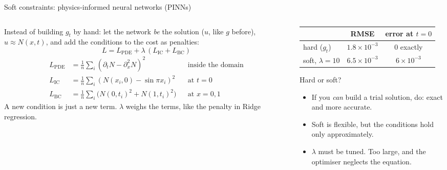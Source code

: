 \documentclass[10pt,aspectratio=169]{beamer}
\begin{document}
\begin{frame}{Soft constraints: physics-informed neural networks (PINNs)}
\begin{columns}[T]
\begin{column}{0.52\textwidth}
\small
Instead of building $g_t$ by hand: let the network \emph{be} the solution
($u$, like $g$ before), $u\approx N(x,t)$, and add the conditions to the cost as penalties:
\[
  L=L_{\mathrm{PDE}}+\lambda\,(L_{\mathrm{IC}}+L_{\mathrm{BC}})
\]
\footnotesize
\vspace{-8pt}
\begin{align*}
  L_{\mathrm{PDE}}&=\tfrac1{n}\textstyle\sum_i(\partial_tN-\partial_x^{2}N)^{2}
     &&\text{inside the domain}\\
  L_{\mathrm{IC}}&=\tfrac1{n}\textstyle\sum_i(N(x_i,0)-\sin\pi x_i)^{2}
     &&\text{at }t=0\\
  L_{\mathrm{BC}}&=\tfrac1{n}\textstyle\sum_i\bigl(N(0,t_i)^{2}+N(1,t_i)^{2}\bigr)
     &&\text{at }x=0,1
\end{align*}
\small
A new condition is just a new term.  $\lambda$ weighs the terms, like the
penalty in Ridge regression.
\end{column}
\begin{column}{0.46\textwidth}
\small
\begin{center}
\begin{tabular}{@{}lcc@{}}
\toprule
& RMSE & error at $t=0$\\
\midrule
hard ($g_t$) & $1.8\times10^{-3}$ & $0$ exactly\\
soft, $\lambda=10$ & $6.5\times10^{-3}$ & $6\times10^{-3}$\\
\bottomrule
\end{tabular}
\end{center}
\begin{block}{Hard or soft?}
\begin{itemize}
  \item If you \emph{can} build a trial solution, do: exact and more
        accurate.
  \item Soft is flexible, but the conditions hold only approximately.
  \item $\lambda$ must be tuned.  Too large, and the optimiser neglects the
        equation.
\end{itemize}
\end{block}
\end{column}
\end{columns}
\end{frame}
\end{document}
